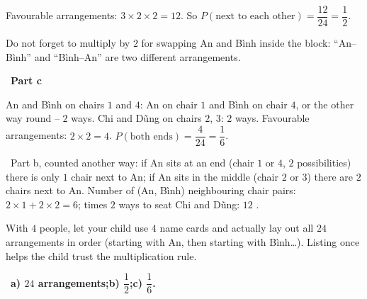 \documentclass[11pt]{article}
\providecommand{\AnsWord}{Đáp số}
\newcommand{\ans}[1]{\par\smallskip{\bfseries\color{tmGreen!88!black}\AnsWord:}\ {\bfseries\color{AnsRed}#1}\par}
\newcommand{\step}[2]{\par\smallskip\noindent{\bfseries\color{tmBlue!85!black}\StepWord~#1.}\ {\bfseries #2}\par\nopagebreak}
\newcommand{\verify}[1]{\par\smallskip\noindent{\bfseries\color{tmGreen!80!black}\faCheckCircle\ \CheckWord}\ #1\par}
\def\AnsWord{Answer}
\def\StepWord{Step}
\def\CheckWord{Check:}
\begin{document}
{Favourable arrangements: $3\times2\times2=12$. So $P(\text{next to each other})=\dfrac{12}{24}=\dfrac12$.
\begin{warnbox}Do not forget to multiply by $2$ for swapping An and Bình inside the block: ``An--Bình'' and ``Bình--An'' are two different arrangements.\end{warnbox}
\step{3}{Part c}
An and Bình on chairs $1$ and $4$: An on chair $1$ and Bình on chair $4$, or the other way round -- $2$ ways. Chi and Dũng on chairs $2$, $3$: $2$ ways. Favourable arrangements: $2\times2=4$.
$P(\text{both ends})=\dfrac{4}{24}=\dfrac16$.
\verify{Part b, counted another way: if An sits at an end (chair $1$ or $4$, $2$ possibilities) there is only $1$ chair next to An; if An sits in the middle (chair $2$ or $3$) there are $2$ chairs next to An. Number of (An, Bình) neighbouring chair pairs: $2\times1+2\times2=6$; times $2$ ways to seat Chi and Dũng: $12$ \checkmark.}
\begin{parentbox}With $4$ people, let your child use $4$ name cards and actually lay out all $24$ arrangements in order (starting with An, then starting with Bình\ldots). Listing once helps the child trust the multiplication rule.\end{parentbox}
\ans{a) $24$ arrangements;\quad b) $\dfrac12$;\quad c) $\dfrac16$.}
}
\end{document}
